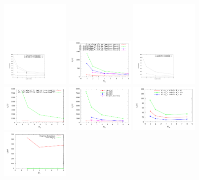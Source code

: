 \documentclass{rspublic}
\begin{document}
\includegraphics[width=0.25\textwidth]{data/graphs/CloudStoreFigure}
\includegraphics[width=0.25\textwidth]{data/graphs/CloudStoreNoComputeSmallerDataSet}
\includegraphics[width=0.25\textwidth]{data/graphs/ConventionalFigure}
\includegraphics[width=0.25\textwidth]{data/graphs/IntelligentExtremes}
\includegraphics[width=0.25\textwidth]{data/graphs/IntelligentVsConventionalFigure}
\includegraphics[width=0.25\textwidth]{data/graphs/LocalFigure}
\includegraphics[width=0.25\textwidth]{data/graphs/StagingAsAPortionOfIntelligenceFigure}
\end{document}
